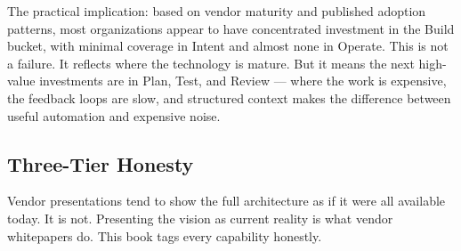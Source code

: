 \documentclass[
  a4paper,
  DIV=11,
  numbers=noendperiod]{scrreprt}
\newcounter{none} %
\begin{document}
The practical implication: based on vendor maturity and published
adoption patterns, most organizations appear to have concentrated
investment in the Build bucket, with minimal coverage in Intent and
almost none in Operate. This is not a failure. It reflects where the
technology is mature. But it means the next high-value investments are
in Plan, Test, and Review --- where the work is expensive, the feedback
loops are slow, and structured context makes the difference between
useful automation and expensive noise.

\subsection{Three-Tier Honesty}\label{three-tier-honesty}

Vendor presentations tend to show the full architecture as if it were
all available today. It is not. Presenting the vision as current reality
is what vendor whitepapers do. This book tags every capability honestly.
\end{document}
